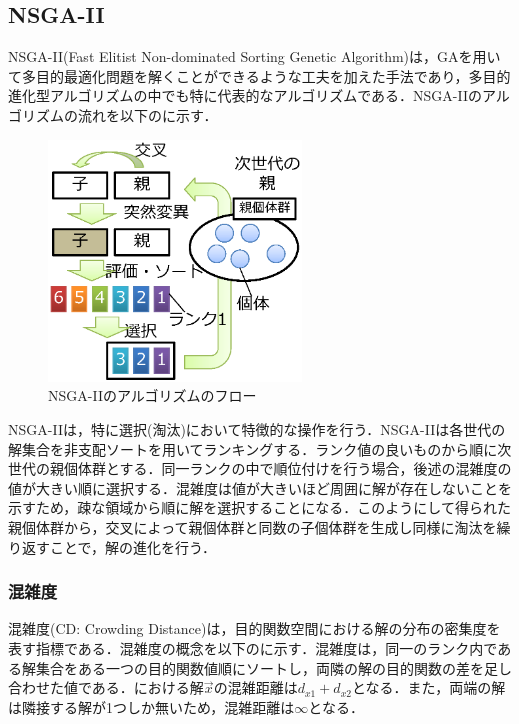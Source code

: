 \subsection{NSGA-II\cite{Deb02}}\label{subsec::NSGAII}
NSGA-II(Fast Elitist Non-dominated Sorting Genetic Algorithm)は，GAを用いて多目的最適化問題を解くことができるような工夫を加えた手法であり，多目的進化型アルゴリズムの中でも特に代表的なアルゴリズムである．NSGA-IIのアルゴリズムの流れを以下のに示す．
\begin{figure}[ht]
    \begin{center}
        \includegraphics[width=0.6\textwidth,keepaspectratio=true]{fig/theory_nsga2.eps}
    \end{center}
    \caption{NSGA-IIのアルゴリズムのフロー}
    \label{fig::theory_nsga2}
\end{figure}
NSGA-IIは，特に選択(淘汰)において特徴的な操作を行う．NSGA-IIは各世代の解集合を非支配ソートを用いてランキングする．ランク値の良いものから順に次世代の親個体群とする．同一ランクの中で順位付けを行う場合，後述の混雑度の値が大きい順に選択する．混雑度は値が大きいほど周囲に解が存在しないことを示すため，疎な領域から順に解を選択することになる．このようにして得られた親個体群から，交叉によって親個体群と同数の子個体群を生成し同様に淘汰を繰り返すことで，解の進化を行う．

\subsubsection{混雑度}
混雑度(CD: Crowding Distance)は，目的関数空間における解の分布の密集度を表す指標である．混雑度の概念を以下のに示す．混雑度は，同一のランク内である解集合をある一つの目的関数値順にソートし，両隣の解の目的関数の差を足し合わせた値である．における解$\vec{x}$の混雑距離は$d_{x1}+d_{x2}$となる．また，両端の解は隣接する解が1つしか無いため，混雑距離は$\infty$となる．

